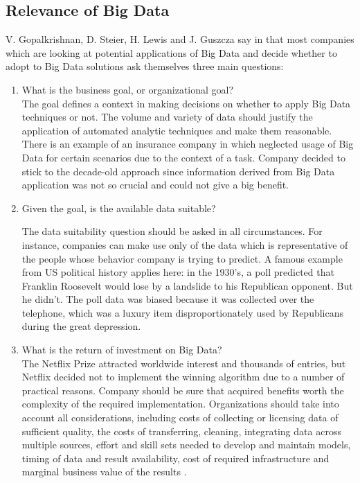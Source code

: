 \documentclass[runningheads]{llncs}
\begin{document}
\subsection{Relevance of Big Data}
V. Gopalkrishnan, D. Steier, H. Lewis and J. Guszcza say in \cite{Gopalkrishnan} that most companies which are looking at potential applications of Big Data and decide whether to adopt to Big Data solutions ask themselves three main questions:
\begin{enumerate}
\item What is the business goal, or organizational goal?\\

The goal defines a context in making decisions on whether to apply Big Data techniques or not. The volume and variety of data should justify the application of automated analytic techniques and make them reasonable. There is an example of an insurance company in \cite{Gopalkrishnan} which neglected usage of Big Data for certain scenarios due to the context of a task. Company decided to stick to the decade-old approach since information derived from Big Data application was not so crucial and could not give a big benefit. 
\item Given the goal, is the available data suitable? 

The data suitability question should be asked in all circumstances. For instance, companies can make use only of the data which is representative of the people whose behavior company is trying to predict. A famous example from US political history applies here: in the 1930's, a poll predicted that Franklin Roosevelt would lose by a landslide to his Republican opponent. But he didn't. The poll data was biased because it was collected over the telephone, which was a luxury item disproportionately used by Republicans during the great depression.\\

\item What is the return of investment on Big Data?\\

The Netflix Prize attracted worldwide interest and thousands of entries, but Netflix decided not to implement the winning algorithm \cite{NETFLIX} due to a number of practical reasons. Company should be sure that acquired benefits worth the complexity of the required implementation. Organizations should take into account all considerations, including costs of collecting or licensing data of sufficient quality, the costs of transferring, cleaning, integrating data across multiple sources, effort and skill sets needed to develop and maintain models, timing of data and result availability, cost of required infrastructure and marginal business value of the results \cite{Gopalkrishnan}.
\end{enumerate}
\end{document}
